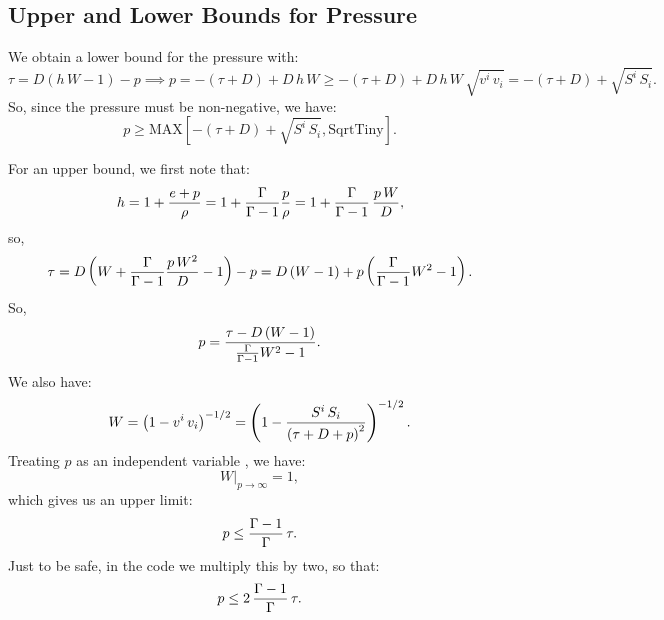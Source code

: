 \documentclass[10pt,preprint]{aastex}
\begin{document}
\subsection{Upper and Lower Bounds for Pressure}
We obtain a lower bound for the pressure with:
\begin{equation}
\tau=D\left(h\,W-1\right)-p\implies p=-\left(\tau+D\right)+D\,h\,W\geq-\left(\tau+D\right)+D\,h\,W\,\sqrt{v^{i}\,v_{i}}=-\left(\tau+D\right)+\sqrt{S^{i}\,S_{i}}.
\end{equation}
So, since the pressure must be non-negative, we have:
\begin{equation}
p\geq\text{MAX}\left[-\left(\tau+D\right)+\sqrt{S^{i}\,S_{i}},\text{SqrtTiny}\right].
\end{equation}

For an upper bound, we first note that:
\begin{equation}
h=1+\frac{e+p}{\rho}=1+\frac{\Gamma}{\Gamma-1}\frac{p}{\rho}=1+\frac{\Gamma}{\Gamma-1}\,\frac{p\,W}{D},
\end{equation}
so,
\begin{equation}
\tau=D\left(W+\frac{\Gamma}{\Gamma-1}\frac{p\,W^{2}}{D}-1\right)-p=D\left(W-1\right)+p\left(\frac{\Gamma}{\Gamma-1}W^{2}-1\right).
\end{equation}
So,
\begin{equation}
p=\frac{\tau-D\left(W-1\right)}{\frac{\Gamma}{\Gamma-1}W^{2}-1}.
\end{equation}
We also have:
\begin{equation}
W=\left(1-v^{i}\,v_{i}\right)^{-1/2}=\left(1-\frac{S^{i}\,S_{i}}{\left(\tau+D+p\right)^{2}}\right)^{-1/2}.
\end{equation}
Treating $p$ as an independent variable , we have:
\begin{equation}
W\Big|_{p\rightarrow\infty}=1,
\end{equation}
which gives us an upper limit:
\begin{equation}
p\leq\frac{\Gamma-1}{\Gamma}\,\tau.
\end{equation}
Just to be safe, in the code we multiply this by two, so that:
\begin{equation}
p\leq2\,\frac{\Gamma-1}{\Gamma}\,\tau.
\end{equation}

\newpage







\end{document}
